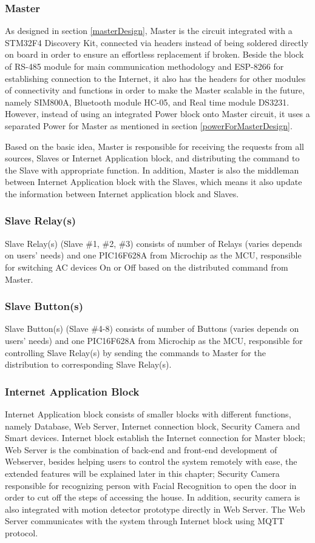     \subsubsection{Master}
    As designed in section \ref{masterDesign}, Master is the circuit integrated with a STM32F4 Discovery Kit, connected via headers instead of being soldered directly on board in order to ensure an effortless replacement if broken. Beside the block of RS-485 module for main communication methodology and ESP-8266 for establishing connection to the Internet, it also has the headers for other modules of connectivity and functions in order to make the Master scalable in the future, namely SIM800A, Bluetooth module HC-05, and Real time module DS3231. However, instead of using an integrated Power block onto Master circuit, it uses a separated Power for Master as mentioned in section \ref{powerForMasterDesign}.

    Based on the basic idea, Master is responsible for receiving the requests from all sources, Slaves or Internet Application block, and distributing the command to the Slave with appropriate function. In addition, Master is also the middleman between Internet Application block with the Slaves, which means it also update the information between Internet application block and Slaves.
    \subsubsection{Slave Relay(s)}
    Slave Relay(s) (Slave \#1, \#2, \#3) consists of number of Relays (varies depends on users’ needs) and one PIC16F628A from Microchip as the MCU, responsible for switching AC devices On or Off based on the distributed command from Master.
    \subsubsection{Slave Button(s)}
    Slave Button(s) (Slave \#4-8) consists of number of Buttons (varies depends on users’ needs) and one PIC16F628A from Microchip as the MCU, responsible for controlling Slave Relay(s) by sending the commands to Master for the distribution to corresponding Slave Relay(s).
    \subsubsection{Internet Application Block}
    Internet Application block consists of smaller blocks with different functions, namely Database, Web Server, Internet connection block, Security Camera and Smart devices. Internet block establish the Internet connection for Master block; Web Server is the combination of back-end and front-end development of Webserver, besides helping users to control the system remotely with ease, the extended features will be explained later in this chapter; Security Camera responsible for recognizing person with Facial Recognition to open the door in order to cut off the steps of accessing the house. In addition, security camera is also integrated with motion detector prototype directly in Web Server. The Web Server communicates with the system through Internet block using MQTT protocol.


